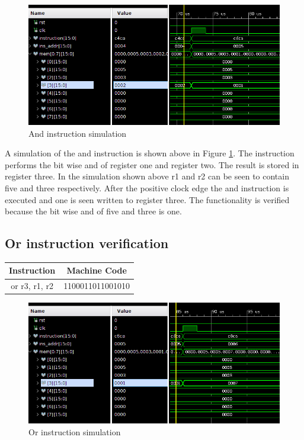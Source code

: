\documentclass{article}
\begin{document}
		\begin{figure}[H]
			\centering
			\includegraphics[width=5in]{img/andinstest.png}
			\caption{And instruction simulation}
			\label{fig:andtest}
		\end{figure}
		
		\begin{par}
			A simulation of the and instruction is shown above in Figure \ref{fig:andtest}. The instruction performs the bit wise and of register one and register two. The result is stored in register three. In the simulation shown above r1 and r2 can be seen to contain five and three respectively. After the positive clock edge the and instruction is executed and one is seen written to register three. The functionality is verified because the bit wise and of five and three is one. 
		\end{par}
		\newpage
		
	\subsection{Or instruction verification}
		\vspace{.5cm}
		\begin{center}
			\begin{tabular}{|c|c|}
				\hline 
				\textbf{Instruction} & \textbf{Machine Code} \\ 
				\hline 
				or r3, r1, r2 & 1100011011001010 \\ 
				\hline 
			\end{tabular} 
		\end{center}
		
		\begin{figure}[H]
			\centering
			\includegraphics[width=5in]{img/orinstb.png}
			\caption{Or instruction simulation}
			\label{fig:orinstb}
		\end{figure}
		
\end{document}
